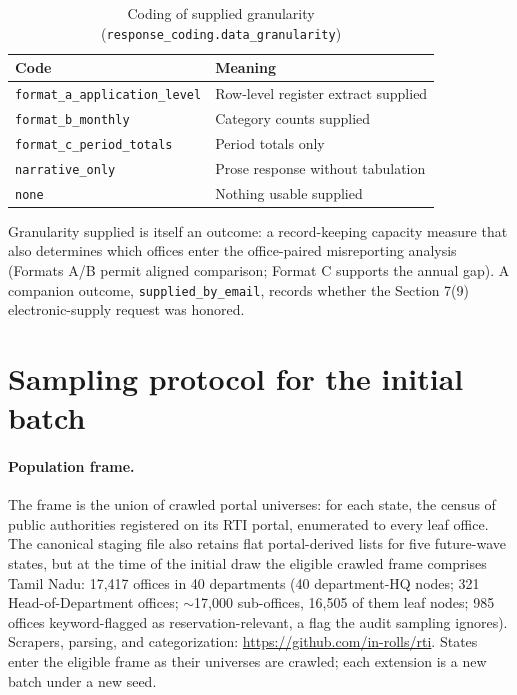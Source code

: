 \documentclass[11pt]{article}
\begin{document}
\begin{table}[htbp]
\centering
\caption{Coding of supplied granularity (\texttt{response\_coding.data\_granularity})}
\begin{tabularx}{\textwidth}{lL}
\toprule
Code & Meaning \\
\midrule
\texttt{format\_a\_application\_level} & Row-level register extract supplied \\
\texttt{format\_b\_monthly} & Category counts supplied \\
\texttt{format\_c\_period\_totals} & Period totals only \\
\texttt{narrative\_only} & Prose response without tabulation \\
\texttt{none} & Nothing usable supplied \\
\bottomrule
\end{tabularx}
\end{table}

Granularity supplied is itself an outcome: a record-keeping capacity measure that also determines which offices enter the office-paired misreporting analysis (Formats A/B permit aligned comparison; Format C supports the annual gap). A companion outcome, \texttt{supplied\_by\_email}, records whether the Section 7(9) electronic-supply request was honored.

\section{Sampling protocol for the initial batch}
\label{si:sampling}

\paragraph{Population frame.} The frame is the union of crawled portal universes: for each state, the census of public authorities registered on its RTI portal, enumerated to every leaf office. The canonical staging file also retains flat portal-derived lists for five future-wave states, but at the time of the initial draw the eligible crawled frame comprises Tamil Nadu: 17,417 offices in 40 departments (40 department-HQ nodes; 321 Head-of-Department offices; $\sim$17,000 sub-offices, 16,505 of them leaf nodes; 985 offices keyword-flagged as reservation-relevant, a flag the audit sampling ignores). Scrapers, parsing, and categorization: \url{https://github.com/in-rolls/rti}. States enter the eligible frame as their universes are crawled; each extension is a new batch under a new seed.
\end{document}
